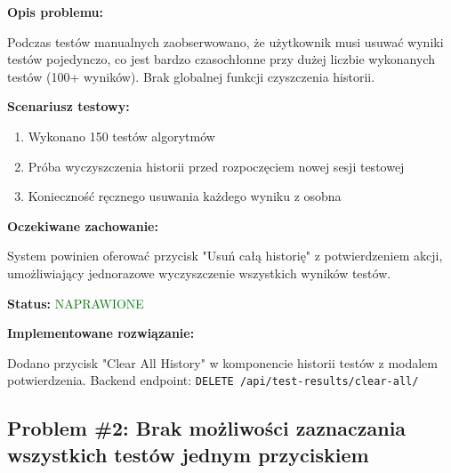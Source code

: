 \documentclass[12pt,a4paper]{article}
\begin{document}
\begin{tcolorbox}[colback=red!5!white,colframe=red!75!black,title=Błąd UI - Priorytet: WYSOKI]
\textbf{Opis problemu:}

Podczas testów manualnych zaobserwowano, że użytkownik musi usuwać wyniki testów pojedynczo, co jest bardzo czasochłonne przy dużej liczbie wykonanych testów (100+ wyników). Brak globalnej funkcji czyszczenia historii.

\textbf{Scenariusz testowy:}
\begin{enumerate}
    \item Wykonano 150 testów algorytmów
    \item Próba wyczyszczenia historii przed rozpoczęciem nowej sesji testowej
    \item Konieczność ręcznego usuwania każdego wyniku z osobna
\end{enumerate}

\textbf{Oczekiwane zachowanie:}

System powinien oferować przycisk "Usuń całą historię" z potwierdzeniem akcji, umożliwiający jednorazowe wyczyszczenie wszystkich wyników testów.

\textbf{Status:} \textcolor{green}{NAPRAWIONE}

\textbf{Implementowane rozwiązanie:}

Dodano przycisk "Clear All History" w komponencie historii testów z modalem potwierdzenia. Backend endpoint: \texttt{DELETE /api/test-results/clear-all/}
\end{tcolorbox}

\subsection{Problem \#2: Brak możliwości zaznaczania wszystkich testów jednym przyciskiem}
\end{document}
